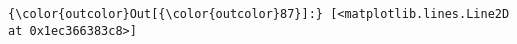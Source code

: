 \documentclass[11pt]{article}
\begin{document}
\begin{Verbatim}[commandchars=\\\{\}]
{\color{outcolor}Out[{\color{outcolor}87}]:} [<matplotlib.lines.Line2D at 0x1ec366383c8>]
\end{Verbatim}
            
    \begin{center}
    \end{center}
    { \hspace*{\fill} \\}
    

    
    
    
    
\end{document}
